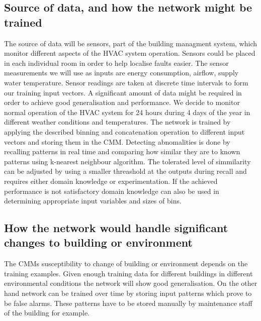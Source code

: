 \documentclass[a4paper, 11pt]{article}
\begin{document}
\subsection{Source of data, and how the network might be trained}
The source of data will be sensors, part of the building managment system, which monitor different aspects of the HVAC system operation. Sensors could be placed in each individual room in order to help localise faults easier. The sensor measurements we will use as inputs are energy consumption, airflow, supply water temperature. Sensor readings are taken at discrete time intervals to form our training input vectors. A significant amount of data might be required in order to achieve good generalisation and performance. We decide to monitor normal operation of the HVAC system for 24 hours during 4 days of the year in different weather conditions and temperatures. The network is trained by applying the described binning and concatenation operation to different input vectors and storing them in the CMM. Detecting abnomalities is done by recalling patterns in real time and comparing how similar they are to known patterns using k-nearest neighbour algorithm. The tolerated level of simmilarity can be adjusted by using a smaller threashold at the outputs during recall and requires either domain knowledge or experimentation. If the achieved performance is not satisfactory domain knowledge can also be used in determining appropriate input variables and sizes of bins.
\subsection{How the network would handle significant changes to building or environment}
The CMMs susceptibility to change of building or environment depends on the training examples. Given enough training data for different buildings in different environmental conditions the network will show good generalisation. On the other hand network can be trained over time by storing input patterns which prove to be false alarms. These patterns have to be stored manually by maintenance staff of the building for example.





\pagebreak
\appendix
\appendixpage


\end{document}
